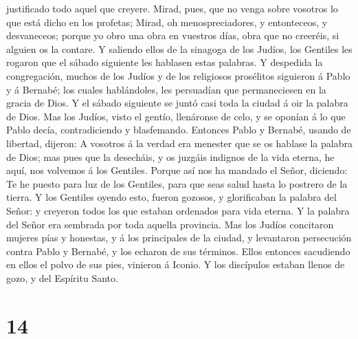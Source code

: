 justificado todo aquel que creyere.  Mirad, pues, que no
venga sobre vosotros lo que está dicho en los profetas; 
Mirad, oh menospreciadores, y entonteceos, y desvaneceos; porque yo obro
una obra en vuestros días, obra que no creeréis, si alguien os la
contare.  Y saliendo ellos de la sinagoga de los Judíos,
los Gentiles les rogaron que el sábado siguiente les hablasen estas
palabras.  Y despedida la congregación, muchos de los
Judíos y de los religiosos prosélitos siguieron á Pablo y á Bernabé; los
cuales hablándoles, les persuadían que permaneciesen en la gracia de
Dios.  Y el sábado siguiente se juntó casi toda la ciudad
á oir la palabra de Dios.  Mas los Judíos, visto el
gentío, llenáronse de celo, y se oponían á lo que Pablo decía,
contradiciendo y blasfemando.  Entonces Pablo y Bernabé,
usando de libertad, dijeron: A vosotros á la verdad era menester que se
os hablase la palabra de Dios; mas pues que la desecháis, y os juzgáis
indignos de la vida eterna, he aquí, nos volvemos á los Gentiles.
 Porque así nos ha mandado el Señor, diciendo: Te he
puesto para luz de los Gentiles, para que seas salud hasta lo postrero
de la tierra.  Y los Gentiles oyendo esto, fueron
gozosos, y glorificaban la palabra del Señor: y creyeron todos los que
estaban ordenados para vida eterna.  Y la palabra del
Señor era sembrada por toda aquella provincia.  Mas los
Judíos concitaron mujeres pías y honestas, y á los principales de la
ciudad, y levantaron persecución contra Pablo y Bernabé, y los echaron
de sus términos.  Ellos entonces sacudiendo en ellos el
polvo de sus pies, vinieron á Iconio.  Y los discípulos
estaban llenos de gozo, y del Espíritu Santo.

\hypertarget{section-13}{%
\section{14}\label{section-13}}

